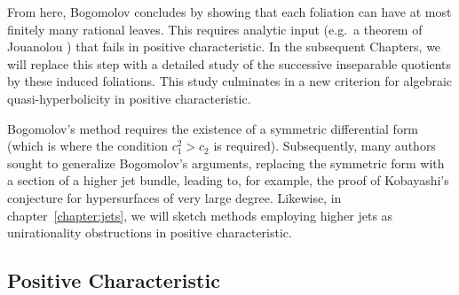 \documentclass[main.tex]{subfiles}
\begin{document}
From here, Bogomolov concludes by showing that each foliation can have at most finitely many rational leaves. This requires analytic input (e.g.\ a theorem of Jouanolou \cite{jouanolou:solutions_to_pfaff_equations}) that fails in positive characteristic. In the subsequent Chapters, we will replace this step with a detailed study of the successive inseparable quotients by these induced foliations. This study culminates in a new criterion for algebraic quasi-hyperbolicity in positive characteristic.
\par 
Bogomolov's method requires the existence of a symmetric differential form (which is where the condition $c_1^2 > c_2$ is required). Subsequently, many authors sought to generalize Bogomolov's arguments, replacing the symmetric form with a section of a higher jet bundle, leading to, for example, the proof of Kobayashi's conjecture for hypersurfaces of very large degree. Likewise, in chapter~\ref{chapter:jets}, we will sketch methods employing higher jets as unirationality obstructions in positive characteristic.

\subsection{Positive Characteristic}
\end{document}
